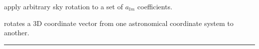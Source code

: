 
\begin{related}
  \begin{sulist}{} %
  \item[\htmlref{rotate\_alm}{sub:rotate_alm}] apply arbitrary sky rotation to a
  set of $a_{lm}$ coefficients.
  \item[\htmlref{xcc\_v\_convert}{sub:xcc_v_convert}] rotates a 3D coordinate
vector from one astronomical coordinate system to another.
  \end{sulist}
\end{related}

\rule{\hsize}{2mm}

\newpage
